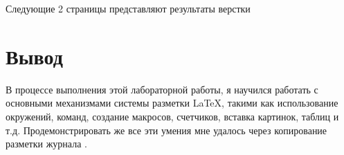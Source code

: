 Следующие 2 страницы представляют результаты верстки

\clearpage



\clearpage



\clearpage

\labstyling

\section{Вывод}

В процессе выполнения этой лабораторной работы, я научился работать с основными механизмами системы разметки \LaTeX, такими как использование окружений, команд, создание макросов, счетчиков, вставка картинок, таблиц и т.д. Продемонстрировать же все эти умения мне удалось через копирование разметки журнала .